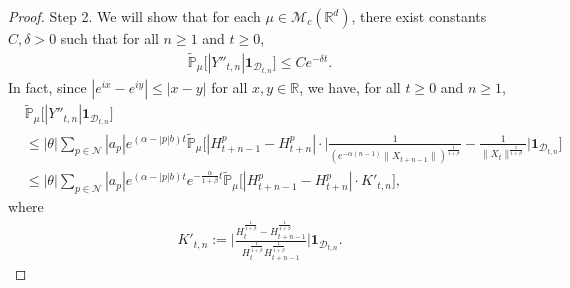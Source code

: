 \documentclass[12pt,a4paper]{amsart}
\theoremstyle{plain}
\theoremstyle{definition}
\numberwithin{equation}{section}
\begin{document}
\begin{proof}
\begin{comment}
    In fact, let $C_1$ be the constant in  Lemma 2.9 corresponding to this fixed $\gamma$ and $C_2$ be the constant in Lemma 2.10.
    By Chebyshev's inequality, there exists $C>0$ such that for all $n \geq 1$ and $t\geq 0$,
\begin{align}
\label{eq: prob of Dtkc11}
    &\mathbb{\tilde{P}}_{\mu}(\mathcal{D}_{t,n}^c)
    \\&\leq \mathbb{\tilde{P}}_{\mu}(|H_t-H_{t+n-1}| > e^{-\eta_0 t})+\mathbb{\tilde{P}}_{\mu}(H_{t}\leq 2e^{-\eta_1 t}),
    \\&\leq \mathbb{P}_{\mu}(D^c)^{-1}e^{\eta_0 t}\mathbb{P}_{\mu}[|H_t-H_{t+n-1}|]+\mathbb{\tilde{P}}(H_t\leq 2e^{-\eta_1 t})
    \\&\leq \mathbb{P}_{\mu}(D^c)^{-1}  e^{\eta_0 t}\|H_t - H_{t+n-1}\|_{\mathbb P_\mu; 1+\gamma}+\mathbb{\tilde{P}}(H_{t}\leq 2e^{-\eta_1t})
    \\&\leq C_1  \mathbb{P}_{\mu}(D^c)^{-1}  e^{-(\frac{\alpha \gamma}{1+\gamma} - \eta_0)t}+C_2 e^{-\eta_1\beta t}.
\end{align}
    This implies the desired result in this step, since $|Y_{t,k}| \leq 2$ a.s..
\end{comment}

    Step 2. We will show that for each $\mu \in \mathcal{M}_c(\mathbb{R}^d)$, there exist constants $C,\delta > 0$ such that for all $n\geq 1$ and $t\geq 0$,
\begin{align}
\label{thm12211}
     \mathbb{\tilde{P}}_{\mu}\big[|Y''_{t,n}|\mathbf{1}_{\mathcal{D}_{t,n}}\big]\leq Ce^{-\delta t}.
\end{align}
    In fact, since $|e^{ix}-e^{iy}|\leq|x-y|$ for all $x,y\in \mathbb R$, we have, for all $t \geq 0$ and $n\geq 1$,
    \begin{align}\label{large: used next}
        &\tilde{\mathbb{P}}_{\mu}\big[|Y''_{t,n}|\mathbf{1}_{\mathcal{D}_{t,n}}\big]\\
        &\leq |\theta|\sum_{p\in\mathcal{N}}|a_p|e^{(\alpha-|p|b)t}\tilde{\mathbb{P}}_{\mu}\Big[|H_{t+n-1}^p-H_{t+n}^p|\cdot\Big|\frac{1}{(e^{-\alpha(n-1)}\|X_{t+n-1}\|)^{\frac{1}{1+\beta}}}-\frac{1}{\|X_t\|^{\frac{1}{1+\beta}}}\Big|\mathbf{1}_{\mathcal{D}_{t,n}}\Big]\\
        &\leq |\theta|\sum_{p\in\mathcal{N}}|a_p|e^{(\alpha-|p|b)t}e^{-\frac{\alpha}{1+\beta}t}\tilde{\mathbb{P}}_{\mu}\Big[|H_{t+n-1}^p-H_{t+n}^p|\cdot K'_{t,n}\Big],
    \end{align}
    where
    \begin{align}
        K'_{t,n}
    :=\Big|\frac{H_t^{\frac{1}{1+\beta}}-H_{t+n-1}^{\frac{1}{1+\beta}}}{H_t^{\frac{1}{1+\beta}}H_{t+n-1}^{\frac{1}{1+\beta}}}\Big|\mathbf{1}_{\mathcal{D}_{t,n}}.
    \end{align}
\begin{comment}


\end{comment}
\end{proof}
\end{document}
